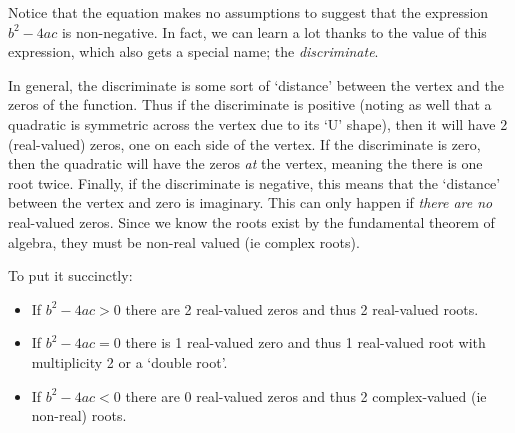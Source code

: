 \documentclass{ximera}
\begin{document}
    Notice that the equation makes no assumptions to suggest that the expression $b^2 - 4ac$ is non-negative. In fact, we can learn a lot thanks to the value of this expression, which also gets a special name; the \textit{discriminate}. 
    
    In general, the discriminate is some sort of `distance' between the vertex and the zeros of the function. Thus if the discriminate is positive (noting as well that a quadratic is symmetric across the vertex due to its `U' shape), then it will have 2 (real-valued) zeros, one on each side of the vertex. If the discriminate is zero, then the quadratic will have the zeros \textit{at} the vertex, meaning the there is one root twice. Finally, if the discriminate is negative, this means that the `distance' between the vertex and zero is imaginary. This can only happen if \textit{there are no} real-valued zeros. Since we know the roots exist by the fundamental theorem of algebra, they must be non-real valued (ie complex roots). 
    
    To put it succinctly:
    
    \begin{itemize}
        \item If $b^2 - 4ac > 0$ there are 2 real-valued zeros and thus 2 real-valued roots.
        \item If $b^2 - 4ac = 0$ there is 1 real-valued zero and thus 1 real-valued root with multiplicity 2 or a `double root'.
        \item If $b^2 - 4ac < 0$ there are 0 real-valued zeros and thus 2 complex-valued (ie non-real) roots.
    \end{itemize}
\end{document}
